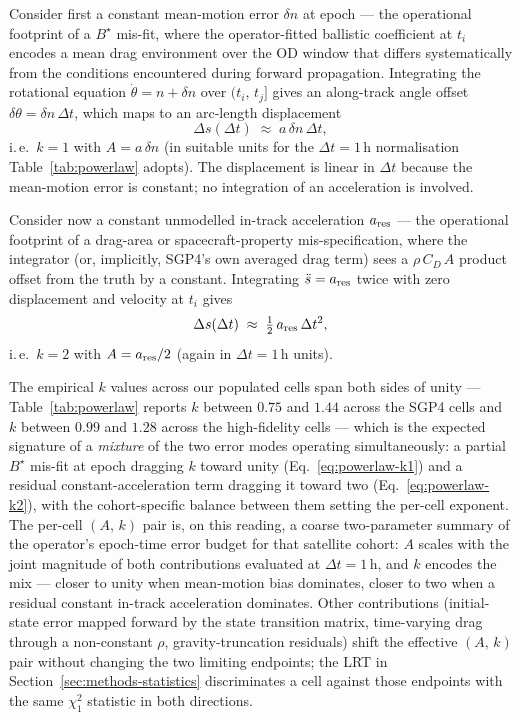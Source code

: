 \documentclass[10pt, letterpaper]{article}
\begin{document}
Consider first a constant mean-motion error $\delta n$ at epoch ---
the operational footprint of a $B^{\!\star}$ mis-fit, where the
operator-fitted ballistic coefficient at $t_{i}$ encodes a mean
drag environment over the OD window that differs systematically
from the conditions encountered during forward propagation.
Integrating the rotational equation $\dot{\theta} = n + \delta n$
over $(t_{i},\,t_{j}]$ gives an along-track angle offset
$\delta\theta = \delta n\,\Delta t$, which maps to an arc-length
displacement
\begin{equation}
  \label{eq:powerlaw-k1}
  \Delta s(\Delta t) \;\approx\; a\,\delta n\,\Delta t,
\end{equation}
i.\,e.\ $k = 1$ with $A = a\,\delta n$ (in suitable units for the
$\Delta t = 1\,\text{h}$ normalisation Table~\ref{tab:powerlaw}
adopts). The displacement is linear in $\Delta t$ because the
mean-motion error is constant; no integration of an acceleration
is involved.

Consider now a constant unmodelled in-track acceleration $a_{\rm{res}}$
--- the operational footprint of a drag-area or
spacecraft-property mis-specification, where the integrator (or,
implicitly, SGP4's own averaged drag term) sees a $\rho\,C_{D}\,A$
product offset from the truth by a constant. Integrating
$\ddot{s} = a_{\rm{res}}$ twice with zero displacement and velocity
at $t_{i}$ gives
\begin{equation}
  \label{eq:powerlaw-k2}
  \Delta s(\Delta t) \;\approx\; \tfrac{1}{2}\,a_{\rm{res}}\,\Delta t^{2},
\end{equation}
i.\,e.\ $k = 2$ with $A = a_{\rm{res}} / 2$ (again in
$\Delta t = 1\,\text{h}$ units).

The empirical $k$ values across our populated cells span both sides
of unity --- Table~\ref{tab:powerlaw} reports $k$ between
$0.75$ and $1.44$ across the SGP4 cells and $k$ between $0.99$ and
$1.28$ across the high-fidelity cells --- which is the expected
signature of a \emph{mixture} of the two error modes operating
simultaneously: a partial $B^{\!\star}$ mis-fit at epoch dragging
$k$ toward unity (Eq.~\eqref{eq:powerlaw-k1}) and a residual
constant-acceleration term dragging it toward two
(Eq.~\eqref{eq:powerlaw-k2}), with the cohort-specific balance
between them setting the per-cell exponent. The per-cell $(A,\,k)$ pair is, on this
reading, a coarse two-parameter summary of the operator's
epoch-time error budget for that satellite cohort: $A$ scales
with the joint magnitude of both contributions evaluated at
$\Delta t = 1\,\text{h}$, and $k$ encodes the mix --- closer to
unity when mean-motion bias dominates, closer to two when a
residual constant in-track acceleration dominates. Other
contributions (initial-state error mapped forward by the state
transition matrix, time-varying drag through a non-constant
$\rho$, gravity-truncation residuals) shift the effective $(A,
\,k)$ pair without changing the two limiting endpoints; the LRT
in Section~\ref{sec:methods-statistics} discriminates a cell
against those endpoints with the same $\chi^{2}_{1}$ statistic
in both directions.
\end{document}
